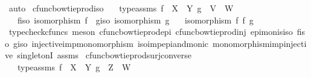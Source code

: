 \begin{isabellebody}
\ auto\isanewline
{}\isamarkupfalse%
%
\endisatagproof
{\isafoldproof}%
%
\isadelimproof
\isanewline
%
\endisadelimproof
\isanewline
{}\isamarkupfalse%
\ cfunc{\isacharunderscore}{\kern0pt}bowtieprod{\isacharunderscore}{\kern0pt}iso{\isacharcolon}{\kern0pt}\isanewline
\ \ \ type{\isacharunderscore}{\kern0pt}assms{\isacharcolon}{\kern0pt}\ {\isachardoublequoteopen}f\ {\isacharcolon}{\kern0pt}\ X\ {\isasymrightarrow}\ Y{\isachardoublequoteclose}\ {\isachardoublequoteopen}g\ {\isacharcolon}{\kern0pt}\ V\ {\isasymrightarrow}\ W{\isachardoublequoteclose}\isanewline
\ \ \ f{\isacharunderscore}{\kern0pt}iso{\isacharcolon}{\kern0pt}\ {\isachardoublequoteopen}isomorphism\ f{\isachardoublequoteclose}\ \ g{\isacharunderscore}{\kern0pt}iso{\isacharcolon}{\kern0pt}\ {\isachardoublequoteopen}isomorphism\ g{\isachardoublequoteclose}\isanewline
\ \ \ {\isachardoublequoteopen}isomorphism\ {\isacharparenleft}{\kern0pt}f\ {\isasymbowtie}\isactrlsub f\ g{\isacharparenright}{\kern0pt}{\isachardoublequoteclose}\isanewline
%
\isadelimproof
\ \ %
\endisadelimproof
%
\isatagproof
{}\isamarkupfalse%
\ {\isacharparenleft}{\kern0pt}typecheck{\isacharunderscore}{\kern0pt}cfuncs{\isacharcomma}{\kern0pt}\ meson\ cfunc{\isacharunderscore}{\kern0pt}bowtieprod{\isacharunderscore}{\kern0pt}epi\ cfunc{\isacharunderscore}{\kern0pt}bowtieprod{\isacharunderscore}{\kern0pt}inj\ epi{\isacharunderscore}{\kern0pt}mon{\isacharunderscore}{\kern0pt}is{\isacharunderscore}{\kern0pt}iso\ f{\isacharunderscore}{\kern0pt}iso\ g{\isacharunderscore}{\kern0pt}iso\ injective{\isacharunderscore}{\kern0pt}imp{\isacharunderscore}{\kern0pt}monomorphism\ iso{\isacharunderscore}{\kern0pt}imp{\isacharunderscore}{\kern0pt}epi{\isacharunderscore}{\kern0pt}and{\isacharunderscore}{\kern0pt}monic\ monomorphism{\isacharunderscore}{\kern0pt}imp{\isacharunderscore}{\kern0pt}injective\ singletonI\ assms{\isacharparenright}{\kern0pt}%
\endisatagproof
{\isafoldproof}%
%
\isadelimproof
\isanewline
%
\endisadelimproof
\isanewline
{}\isamarkupfalse%
\ cfunc{\isacharunderscore}{\kern0pt}bowtieprod{\isacharunderscore}{\kern0pt}surj{\isacharunderscore}{\kern0pt}converse{\isacharcolon}{\kern0pt}\isanewline
\ \ \ type{\isacharunderscore}{\kern0pt}assms{\isacharcolon}{\kern0pt}\ {\isachardoublequoteopen}f\ {\isacharcolon}{\kern0pt}\ X\ {\isasymrightarrow}\ Y{\isachardoublequoteclose}\ {\isachardoublequoteopen}g\ {\isacharcolon}{\kern0pt}\ Z\ {\isasymrightarrow}\ W{\isachardoublequoteclose}\isanewline

\end{isabellebody}
